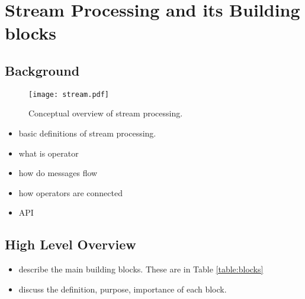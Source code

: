 \section{Stream Processing and its Building blocks}

\subsection{Background}

\begin{figure}[h]
	\centering
	\texttt{[image: stream.pdf]}
	\caption{Conceptual overview of stream processing.}
	\label{fig:stream}
\end{figure}


\begin{itemize}
	\item basic definitions of stream processing. 
	\item what is operator
	\item how do messages flow
	\item how operators are connected
	\item API
\end{itemize}





\subsection{High Level Overview}
\begin{itemize}
	\item describe the main building blocks. These are in Table \ref{table:blocks}
	\item discuss the definition, purpose, importance of each block.	
\end{itemize}


\begin{table}[h]
\end{table}

